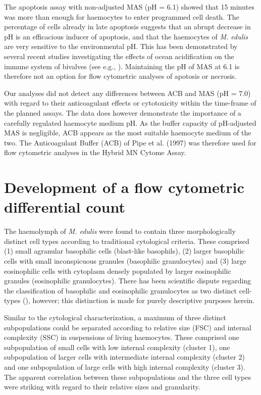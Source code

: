 The apoptosis assay with non-adjusted MAS (pH = 6.1) showed that 15 minutes was more than enough for haemocytes to enter programmed cell death. The percentage of cells already in late apoptosis suggests that an abrupt decrease in pH is an efficacious inducer of apoptosis, and that the haemocytes of \emph{M. edulis} are very sensitive to the environmental pH. This has been demonstrated by several recent studies investigating the effects of ocean acidification on the immune system of bivalves (see e.g., \cite{Wang2016, Dang2023}). Maintaining the pH of MAS at 6.1 is therefore not an option for flow cytometric analyses of apotosis or necrosis.

Our analyses did not detect any differences between ACB and MAS (pH = 7.0) with regard to their anticoagulant effects or cytotoxicity within the time-frame of the planned assays. The data does however demonstrate the importance of a carefully regulated haemocyte medium pH. As the buffer capacity of pH-adjusted MAS is negligible, ACB appears as the most suitable haemocyte medium of the two. The Anticoagulant Buffer (ACB) of Pipe et al. (1997) was therefore used for flow cytometric analyses in the Hybrid MN Cytome Assay.

\section{Development of a flow cytometric differential count}
The haemolymph of \emph{M. edulis} were found to contain three morphologically distinct cell types according to traditional cytological criteria. These comprised (1) small agranular basophilic cells (blast-like basophils), (2) larger basophilic cells with small inconspicuous granules (basophilic granulocytes) and (3) large eosinophilic cells with cytoplasm densely populated by larger eosinophilic granules (eosinophilic granulocytes). There has been scientific dispute regarding the classification of basophilic and eosinophilic granulocytes as two distinct cell-types (\cite{Cheng1980}), however; this distinction is made for purely descriptive purposes herein.

Similar to the cytological characterization, a maximum of three distinct subpopulations could be separated according to relative size (FSC) and internal complexity (SSC) in suspensions of living haemocytes. These comprised one subpopulation of small cells with low internal complexity (cluster 1), one subpopulation of larger cells with intermediate internal complexity (cluster 2) and one subpopulation of large cells with high internal complexity (cluster 3). The apparent correlation between these subpopulations and the three cell types were striking with regard to their relative sizes and granularity.


